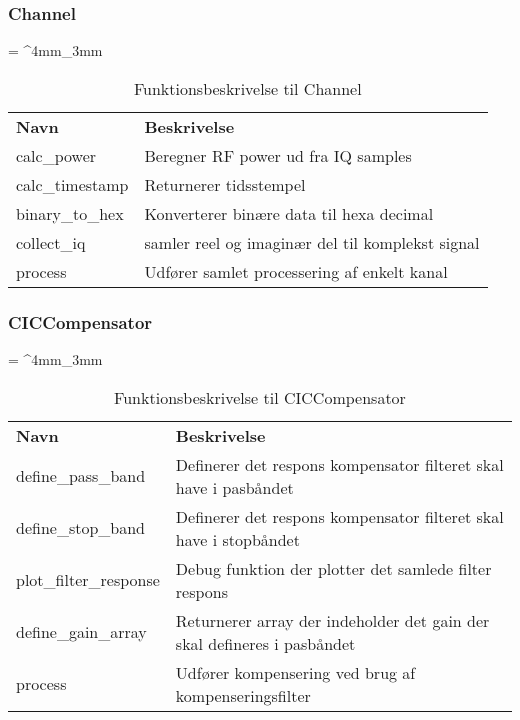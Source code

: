 \begin{appendices}
\subsubsection{Channel}
\begin{table}[H]
	\renewcommand{\arraystretch}{2}
	\centering
	\sffamily
	\tabulinesep = ^4mm_3mm
	\begin{tabu}{ m{4cm}  m{8.5cm} }
		\color{white}\bfseries Navn &\color{white}\bfseries Beskrivelse \\
		calc\_power & Beregner RF power ud fra IQ samples \\
		calc\_timestamp & Returnerer tidsstempel \\
		binary\_to\_hex & Konverterer binære data til hexa decimal \\
		collect\_iq & samler reel og imaginær del til komplekst signal \\
		process & Udfører samlet processering af enkelt kanal \\
	\end{tabu}
	\caption{Funktionsbeskrivelse til Channel}
	\label{tab:func_descr_Channel}
\end{table}

\subsubsection{CICCompensator}
\begin{table}[H]
	\renewcommand{\arraystretch}{2}
	\centering
	\sffamily
	\tabulinesep = ^4mm_3mm
	\begin{tabu}{ m{4cm}  m{8.5cm} }
		\color{white}\bfseries Navn &\color{white}\bfseries Beskrivelse \\
		define\_pass\_band & Definerer det respons kompensator filteret skal have i pasbåndet \\
		define\_stop\_band & Definerer det respons kompensator filteret skal have i stopbåndet \\
		plot\_filter\_response & Debug funktion der plotter det samlede filter respons \\
		define\_gain\_array & Returnerer array der indeholder det gain der skal defineres i pasbåndet \\
		process & Udfører kompensering ved brug af kompenseringsfilter \\
	\end{tabu}
	\caption{Funktionsbeskrivelse til CICCompensator}
	\label{tab:func_descr_CICCompensator}
\end{table}


\end{appendices}
